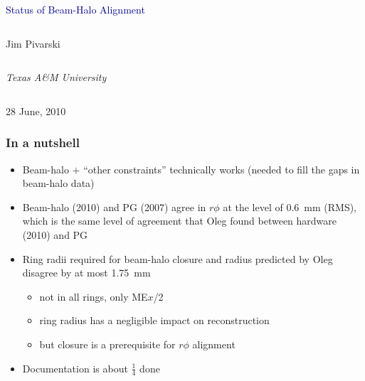 \documentclass[compress]{beamer}
\begin{document}
\begin{frame}
\vfill
\begin{center}
\textcolor{darkblue}{\Large Status of Beam-Halo Alignment}

\vfill
\begin{columns}
\begin{center}
\large
Jim Pivarski
\end{center}
\end{columns}

\begin{columns}
\begin{center}
\scriptsize
{\it Texas A\&M University}
\end{center}
\end{columns}

\vfill
28 June, 2010

\end{center}
\end{frame}


\small

\begin{frame}
\frametitle{In a nutshell}
\begin{itemize}
\item Beam-halo $+$ ``other constraints'' technically works (needed to fill the gaps in beam-halo data)
\item Beam-halo (2010) and PG (2007) agree in $r\phi$ at the level of 0.6~mm (RMS), which is the same level of agreement that Oleg found between hardware (2010) and PG
\item Ring radii required for beam-halo closure and radius predicted by Oleg disagree by at most 1.75~mm
\begin{itemize}
\item not in all rings, only ME$x$/2
\item ring radius has a negligible impact on reconstruction
\item but closure is a prerequisite for $r\phi$ alignment
\end{itemize}
\item Documentation is about $\frac{1}{4}$ done
\end{itemize}
\end{frame}
\end{document}
